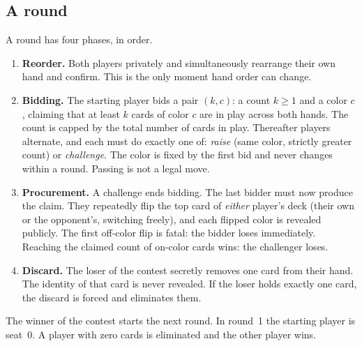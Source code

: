 \documentclass[11pt]{article}
\theoremstyle{plain}
\theoremstyle{definition}
\theoremstyle{remark}
\begin{document}
\subsection{A round}

A round has four phases, in order.

\begin{enumerate}\itemsep3pt
  \item[\textbf{1.}] \textbf{Reorder.} Both players privately and
        simultaneously rearrange their own hand and confirm. This is the
        only moment hand order can change.
  \item[\textbf{2.}] \textbf{Bidding.} The starting player bids a pair
        $(k,c)$: a count $k\ge 1$ and a color $c$, claiming that at least
        $k$ cards of color $c$ are in play across both hands. The count is
        capped by the total number of cards in play. Thereafter players
        alternate, and each must do exactly one of:
        \emph{raise} (same color, strictly greater count) or
        \emph{challenge}. The color is fixed by the first bid and never
        changes within a round. Passing is not a legal move.
  \item[\textbf{3.}] \textbf{Procurement.} A challenge ends bidding. The
        last bidder must now produce the claim. They repeatedly flip the
        top card of \emph{either} player's deck (their own or the
        opponent's, switching freely), and each flipped color is revealed
        publicly. The first off-color flip is fatal: the bidder loses
        immediately. Reaching the claimed count of on-color cards wins:
        the challenger loses.
  \item[\textbf{4.}] \textbf{Discard.} The loser of the contest secretly
        removes one card from their hand. The identity of that card is
        never revealed. If the loser holds exactly one card, the discard is
        forced and eliminates them.
\end{enumerate}

The winner of the contest starts the next round. In round~1 the starting
player is seat~$0$. A player with zero cards is eliminated and the other
player wins.
\end{document}
